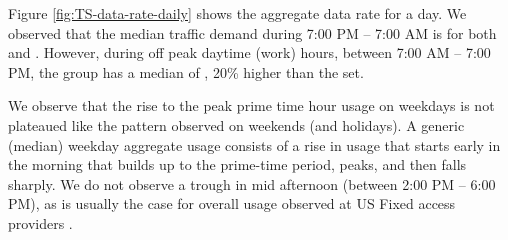 Figure \ref{fig:TS-data-rate-daily} shows the aggregate data rate for a day. 
We observed that the median traffic demand during 7:00 PM -- 7:00 AM is 
 for both \treatment{} and \control{}. However, during off peak 
daytime (work) hours, between 7:00 AM -- 7:00 PM, the \treatment{} group has a 
median of , 20\% higher than the \control{} set.

We observe that the rise to the peak prime time hour usage 
on weekdays is not plateaued like the pattern observed on weekends (and 
holidays). A generic (median) weekday aggregate usage consists of a rise in 
usage that starts early in the morning that builds up to the prime-time period, 
peaks, and then falls sharply. We do not observe a trough in mid afternoon 
(between 2:00 PM -- 6:00 PM), as is usually the case for overall usage observed 
at US Fixed access providers \cite{sandvine20141h}.




